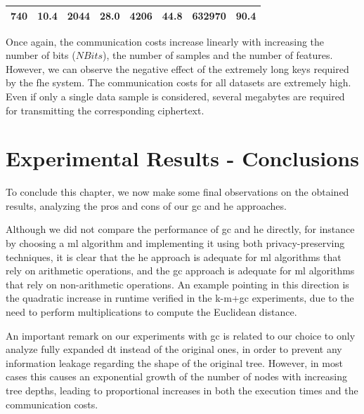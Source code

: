 \begin{table}[H]
\begin{tabular}{|c|c|c|c|c|c|c|c|}
740                                                         & 10.4                                                    & 2044                                                        & 28.0                                                    & 4206                                                        & 44.8                                                    & 632970                                                      & 90.4                                                    \\ \hline
\end{tabular}
\end{table}

Once again, the communication costs increase linearly with increasing the number of bits ($NBits$), the number of samples and the number of features. However, we can observe the negative effect of the extremely long keys required by the \ac{fhe} system. The communication costs for all datasets are extremely high. Even if only a single data sample is considered, several megabytes are required for transmitting the corresponding ciphertext.



\section{Experimental Results - Conclusions}
\label{sec:ExperimentalResultsConclusion}


To conclude this chapter, we now make some final observations on the obtained results, analyzing the pros and cons of our \ac{gc} and \ac{he} approaches.

Although we did not compare the performance of \ac{gc} and \ac{he} directly, for instance by choosing a \ac{ml} algorithm and implementing it using both privacy-preserving techniques, it is clear that the \ac{he} approach is adequate for \ac{ml} algorithms that rely on arithmetic operations, and the \ac{gc} approach is adequate for \ac{ml} algorithms that rely on non-arithmetic operations. An example pointing in this direction is the quadratic increase in runtime verified in the \ac{k-m}+\ac{gc} experiments, due to the need to perform multiplications to compute the Euclidean distance.

An important remark on our experiments with \ac{gc} is related to our choice to only analyze fully expanded \ac{dt} instead of the original ones, in order to prevent any information leakage regarding the shape of the original tree. However, in most cases this causes an exponential growth of the number of nodes with increasing tree depths, leading to proportional increases in both the execution times and the communication costs.
  

